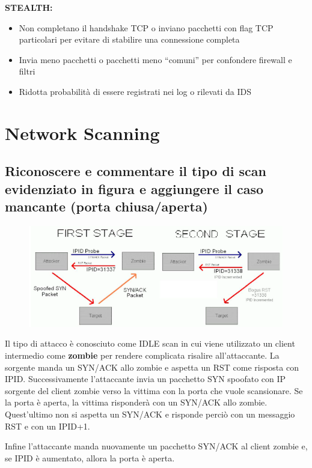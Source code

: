 \documentclass{report}
\begin{document}
\noindent \textbf{STEALTH:}
\begin{itemize}
    \item Non completano il handshake TCP o inviano pacchetti con flag TCP particolari per evitare di stabilire una connessione completa
    \item Invia meno pacchetti o pacchetti meno “comuni” per confondere firewall e filtri
    \item Ridotta probabilità di essere registrati nei log o rilevati da IDS
\end{itemize}



\chapter{Network Scanning}
\section{Riconoscere e commentare il tipo di scan evidenziato in figura e aggiungere il caso mancante (porta chiusa/aperta)}
\begin{figure}[H]
    \centering
    \includegraphics[width=1\linewidth]{images/scanEvidenziato.png}
\end{figure}

\noindent Il tipo di attacco è conosciuto come IDLE scan in cui viene utilizzato 
un client intermedio come \textbf{zombie} per rendere complicata risalire all'attaccante. 
La sorgente manda un SYN/ACK allo zombie e aspetta un RST come risposta con IPID. 
Successivamente l'attaccante invia un pacchetto SYN spoofato con IP sorgente del client zombie verso 
la vittima con la porta che vuole scansionare. 
Se la porta è aperta, la vittima risponderà con un SYN/ACK allo zombie. Quest'ultimo non si aspetta un SYN/ACK e risponde 
perciò con un messaggio RST e con un IPID+1. 

\noindent Infine l'attaccante manda nuovamente un pacchetto SYN/ACK al client zombie e, se IPID è aumentato, allora la porta è aperta.
\end{document}
